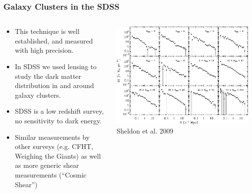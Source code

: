 \documentclass{beamer}
\begin{document}
\frame
{
    \frametitle{Galaxy Clusters in the SDSS}
    \fontsize{10}{0.8\baselineskip}

    \begin{columns}
        \begin{column}{0.5\textwidth}
            \begin{itemize}

                \item This technique is well established, and measured with high precision.

                \item In SDSS we used lensing to study the dark matter distribution in
                    and around galaxy clusters.

                \item SDSS is a low redshift survey, no sensitivity to dark energy.

                \item Similar measurements by other surveys (e.g. CFHT, Weighing the Giants)
                    as well as more generic shear measurements (``Cosmic Shear'')

            \end{itemize}
        \end{column}

        \begin{column}{0.5\textwidth}
            \includegraphics[width=\textwidth]{maxbcg_sample21-22_ngals200_12_jackknife.pdf}
            \newline
            Sheldon et al. 2009
        \end{column}
    \end{columns}
}
\end{document}
